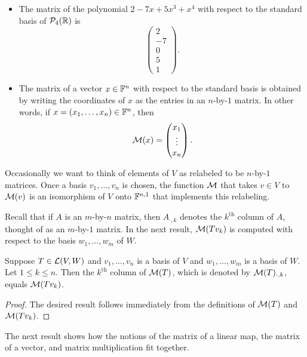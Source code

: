 \begin{example}\label{ax:3.74}\leavevmode
\begin{itemize}
\item The matrix of the polynomial $2-7x+5x^3+x^4$ with respect to the standard
  basis of $\mathcal{P}_4(\mathbb{R})$ is
  \[ \begin{pmatrix} 2\\ -7\\ 0\\ 5\\ 1 \end{pmatrix}. \]
\item The matrix of a vector $x\in\mathbb{F}^n$ with respect to the standard basis is
  obtained by writing the coordinates of $x$ as the entries in an $n$-by-$1$
  matrix. In other words, if $x=(x_1,\dots,x_n)\in\mathbb{F}^n$, then
  \[ \mathcal{M}(x) = \begin{pmatrix} x_1\\ \vdots\\ x_n \end{pmatrix}. \]
\end{itemize}
\end{example}

Occasionally we want to think of elements of $V$ as relabeled to be $n$-by-$1$
matrices. Once a basis $v_1,\dots,v_n$ is chosen, the function $\mathcal{M}$ that
takes $v\in V$ to $\mathcal{M}(v)$ is an isomorphism of $V$ onto $\mathbb{F}^{n,1}$ that
implements this relabeling.

Recall that if $A$ is an $m$-by-$n$ matrix, then $A_{\cdot,k}$ denotes the
$k^{\text{th}}$ column of $A$, thought of as an $m$-by-$1$ matrix. In the next
result, $\mathcal{M}(Tv_k)$ is computed with respect to the basis $w_1,\dots,w_m$ of
$W$.

\begin{result}[$\Mat(T)_{\cdot,k}=\Mat(Tv_k)$]\label{ax:3.75}
Suppose $T\in\mathcal{L}(V,W)$ and $v_1,\dots,v_n$ is a basis of $V$ and
$w_1,\dots,w_m$ is a basis of $W$. Let $1\le k\le n$. Then the
$k^{\text{th}}$ column of $\mathcal{M}(T)$, which is denoted by $\mathcal{M}(T)_{\cdot,k}$,
equals $\mathcal{M}(Tv_k)$.
\end{result}

\begin{proof}
The desired result follows immediately from the definitions of $\mathcal{M}(T)$ and
$\mathcal{M}(Tv_k)$.
\end{proof}

The next result shows how the notions of the matrix of a linear map, the matrix
of a vector, and matrix multiplication fit together.

